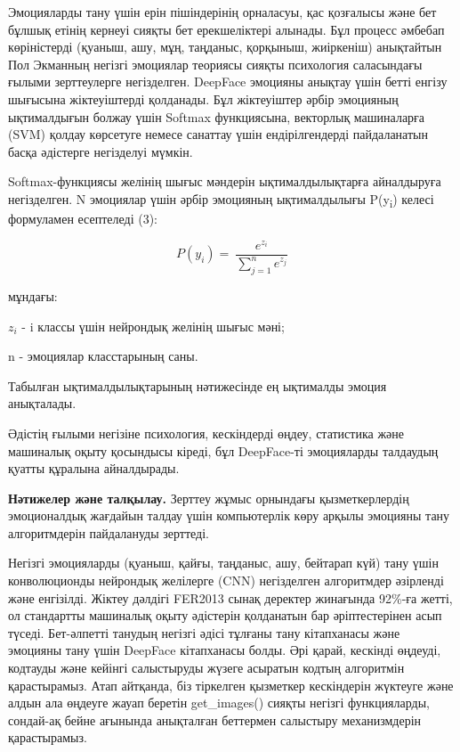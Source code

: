 \begin{multicols}{2}
Эмоцияларды тану үшін ерін пішіндерінің орналасуы, қас қозғалысы және
бет бұлшық етінің кернеуі сияқты бет ерекшеліктері алынады. Бұл процесс
әмбебап көріністерді (қуаныш, ашу, мұң, таңданыс, қорқыныш, жиіркеніш)
анықтайтын Пол Экманның негізгі эмоциялар теориясы сияқты психология
саласындағы ғылыми зерттеулерге негізделген. DeepFace эмоцияны анықтау
үшін бетті енгізу шығысына жіктеуіштерді қолданады. Бұл жіктеуіштер
әрбір эмоцияның ықтималдығын болжау үшін Softmax функциясына, векторлық
машиналарға (SVM) қолдау көрсетуге немесе санаттау үшін ендірілгендерді
пайдаланатын басқа әдістерге негізделуі мүмкін.

Softmax-функциясы желінің шығыс мәндерін ықтималдылықтарға айналдыруға
негізделген. N эмоциялар үшін әрбір эмоцияның ықтималдылығы
P(y\textsubscript{i}) келесі формуламен есептеледі (3):

\begin{equation}
P\left( y_{i} \right) = \ \frac{e^{z_{i}}}{\sum_{j = 1}^{n}e^{z_{j}}}
\end{equation}

мұндағы:

\(z_{i}\) - i классы үшін нейрондық желінің шығыс мәні;

n - эмоциялар класстарының саны.

Табылған ықтималдылықтарының нәтижесінде ең ықтималды эмоция анықталады.

Әдістің ғылыми негізіне психология, кескіндерді өңдеу, статистика және
машиналық оқыту қосындысы кіреді, бұл DeepFace-ті эмоцияларды талдаудың
қуатты құралына айналдырады.

{\bfseries Нәтижелер және талқылау.} Зерттеу жұмыс орнындағы
қызметкерлердің эмоционалдық жағдайын талдау үшін компьютерлік көру
арқылы эмоцияны тану алгоритмдерін пайдалануды зерттеді.

Негізгі эмоцияларды (қуаныш, қайғы, таңданыс, ашу, бейтарап күй) тану
үшін конволюционды нейрондық желілерге (CNN) негізделген алгоритмдер
әзірленді және енгізілді. Жіктеу дәлдігі FER2013 сынақ деректер
жинағында 92\%-ға жетті, ол стандартты машиналық оқыту әдістерін
қолданатын бар әріптестерінен асып түседі. Бет-әлпетті танудың негізгі
әдісі тұлғаны тану кітапханасы және эмоцияны тану үшін DeepFace
кітапханасы болды. Әрі қарай, кескінді өңдеуді, кодтауды және кейінгі
салыстыруды жүзеге асыратын кодтың алгоритмін қарастырамыз. Атап
айтқанда, біз тіркелген қызметкер кескіндерін жүктеуге және алдын ала
өңдеуге жауап беретін get\_images() сияқты негізгі функцияларды,
сондай-ақ бейне ағынында анықталған беттермен салыстыру механизмдерін
қарастырамыз.


\end{multicols}
